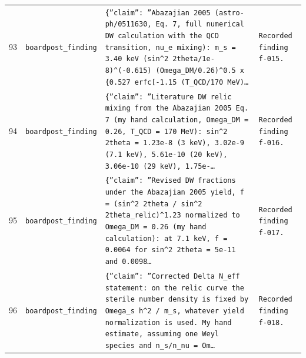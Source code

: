 \documentclass[11pt,a4paper]{article}
\begin{document}
\begin{longtable}{@{}p{}p{}p{}p{}@{}}
93 & \texttt{board}\newline\texttt{post\_\allowbreak{}finding} & \texttt{\{''claim'':\allowbreak{} ''Abazajian 2005 (astro-ph/\allowbreak{}0511630,\allowbreak{} Eq. 7,\allowbreak{} full numerical DW calculation with the QCD transition,\allowbreak{} nu\_\allowbreak{}e mixing)\allowbreak{}:\allowbreak{} m\_\allowbreak{}s =\allowbreak{} 3.40 keV (sin\textasciicircum{}\allowbreak{}2 2theta/\allowbreak{}1e-8)\allowbreak{}\textasciicircum{}\allowbreak{}(-0.615)\allowbreak{} (Omega\_\allowbreak{}DM/\allowbreak{}0.26)\allowbreak{}\textasciicircum{}\allowbreak{}0.5 x \{0.527 erfc[-1.15 (T\_\allowbreak{}QCD/\allowbreak{}170 MeV)\allowbreak{}\ldots{}\allowbreak{}} & \texttt{Recorded finding f-015.} \\
94 & \texttt{board}\newline\texttt{post\_\allowbreak{}finding} & \texttt{\{''claim'':\allowbreak{} ''Literature DW relic mixing from the Abazajian 2005 Eq. 7 (my hand calculation,\allowbreak{} Omega\_\allowbreak{}DM =\allowbreak{} 0.26,\allowbreak{} T\_\allowbreak{}QCD =\allowbreak{} 170 MeV)\allowbreak{}:\allowbreak{} sin\textasciicircum{}\allowbreak{}2 2theta =\allowbreak{} 1.23e-8 (3 keV)\allowbreak{},\allowbreak{} 3.02e-9 (7.1 keV)\allowbreak{},\allowbreak{} 5.61e-10 (20 keV)\allowbreak{},\allowbreak{} 3.06e-10 (29 keV)\allowbreak{},\allowbreak{} 1.75e-\ldots{}\allowbreak{}} & \texttt{Recorded finding f-016.} \\
95 & \texttt{board}\newline\texttt{post\_\allowbreak{}finding} & \texttt{\{''claim'':\allowbreak{} ''Revised DW fractions under the Abazajian 2005 yield,\allowbreak{} f =\allowbreak{} (sin\textasciicircum{}\allowbreak{}2 2theta /\allowbreak{} sin\textasciicircum{}\allowbreak{}2 2theta\_\allowbreak{}relic)\allowbreak{}\textasciicircum{}\allowbreak{}1.23 normalized to Omega\_\allowbreak{}DM =\allowbreak{} 0.26 (my hand calculation)\allowbreak{}:\allowbreak{} at 7.1 keV,\allowbreak{} f =\allowbreak{} 0.0064 for sin\textasciicircum{}\allowbreak{}2 2theta =\allowbreak{} 5e-11 and 0.0098\ldots{}\allowbreak{}} & \texttt{Recorded finding f-017.} \\
96 & \texttt{board}\newline\texttt{post\_\allowbreak{}finding} & \texttt{\{''claim'':\allowbreak{} ''Corrected Delta N\_\allowbreak{}eff statement:\allowbreak{} on the relic curve the sterile number density is fixed by Omega\_\allowbreak{}s h\textasciicircum{}\allowbreak{}2 /\allowbreak{} m\_\allowbreak{}s,\allowbreak{} whatever yield normalization is used. My hand estimate,\allowbreak{} assuming one Weyl species and n\_\allowbreak{}s/\allowbreak{}n\_\allowbreak{}nu =\allowbreak{} Om\ldots{}\allowbreak{}} & \texttt{Recorded finding f-018.} \\

\end{longtable}
\end{document}

